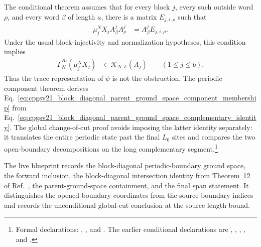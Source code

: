 \documentclass{article}
\begin{document}
The conditional theorem assumes that for every block $j$, every such outside
word $\rho$, and every word $\beta$ of length $a$, there is a matrix
$E_{j,i,\rho}$ such that
\begin{align}
  \mu_j^NX_jA^j_\beta A^j_\rho
    &=
    A^j_\beta E_{j,i,\rho}.
  \label{eq:cpgsv21_block_diagonal_parent_ground_space_complementary_identity}
\end{align}
Under the usual block-injectivity and normalization hypotheses, this condition
implies
\begin{align}
  \Gamma_N^{A_j}(\mu_j^NX_j)
    &\in
    \mathcal K_{N,L}(A_j)
    \qquad (1\leq j\leq b).
  \label{eq:cpgsv21_block_diagonal_parent_ground_space_component_membership}
\end{align}
Thus the trace representation of $\psi$ is not the obstruction. The periodic
component theorem derives
Eq.~\ref{eq:cpgsv21_block_diagonal_parent_ground_space_component_membership}
from
Eq.~\ref{eq:cpgsv21_block_diagonal_parent_ground_space_complementary_identity}.
The global change-of-cut proof avoids imposing the latter identity separately:
it translates the entire periodic state past the final $L_0$ sites and compares
the two open-boundary decompositions on the long complementary
segment.\footnote{Formal declarations:
,
,
and
.
The earlier conditional declarations are
,
,
,
,
and
.}

The live blueprint records the block-diagonal periodic-boundary ground space,
the forward inclusion, the block-diagonal intersection identity from
Theorem~12 of Ref.~\cite{PerezGarcia2007MPSReps}, the parent-ground-space
containment, and the final span statement. It distinguishes the opened-boundary
coordinates from the source boundary indices and records the unconditional
global-cut conclusion at the source length bound.
\end{document}
